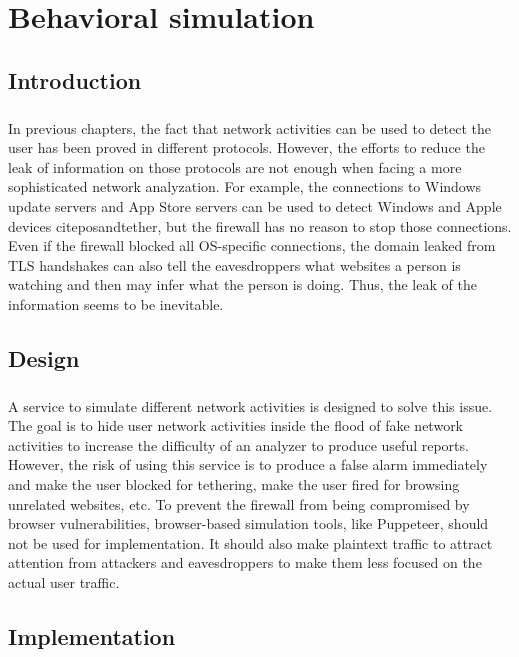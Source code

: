\documentclass[mscthesis]{usiinfthesis}
\begin{document}
\chapter{Behavioral simulation}
\section{Introduction}
\paragraph{}
In previous chapters, the fact that network activities can be used to detect the user has been proved in different protocols. However, the efforts to reduce the leak of information on those protocols are not enough when facing a more sophisticated network analyzation. For example, the connections to Windows update servers and App Store servers can be used to detect Windows and Apple devices citep{osandtether}, but the firewall has no reason to stop those connections. Even if the firewall blocked all OS-specific connections, the domain leaked from TLS handshakes can also tell the eavesdroppers what websites a person is watching and then may infer what the person is doing. Thus, the leak of the information seems to be inevitable.

\section{Design}
\paragraph{}
A service to simulate different network activities is designed to solve this issue. The goal is to hide user network activities inside the flood of fake network activities to increase the difficulty of an analyzer to produce useful reports. However, the risk of using this service is to produce a false alarm immediately and make the user blocked for tethering, make the user fired for browsing unrelated websites, etc. To prevent the firewall from being compromised by browser vulnerabilities, browser-based simulation tools, like Puppeteer, should not be used for implementation. It should also make plaintext traffic to attract attention from attackers and eavesdroppers to make them less focused on the actual user traffic.

\section{Implementation}
\end{document}
